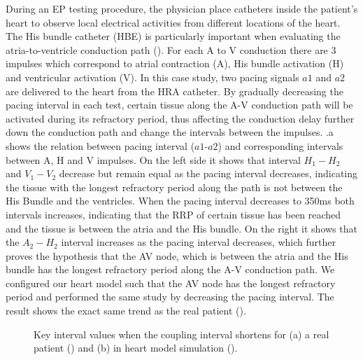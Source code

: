 During an EP testing procedure, the physician place catheters inside the patient's heart to observe local electrical activities from different locations of the heart. The His bundle catheter (HBE) is particularly important when evaluating the atria-to-ventricle conduction path (). For each A to V conduction there are 3 impulses which correspond to atrial contraction (A), His bundle activation (H) and ventricular activation (V).  In this case study, two pacing signals $a1$ and $a2$ are delivered to the heart from the HRA catheter. By gradually decreasing the pacing interval in each test, certain tissue along the A-V conduction path will be activated during its refractory period, thus affecting the conduction delay further down the conduction path and change the intervals between the impulses. .a shows the relation between pacing interval ($a1$-$a2$) and corresponding intervals between A, H and V impulses. On the left side it shows that interval $H_1-H_2$ and $V_1-V_2$ decrease but remain equal as the pacing interval decreases, indicating the tissue with the longest refractory period along the path is not between the His Bundle and the ventricles. When the pacing interval decreases to 350ms both intervals increases, indicating that the RRP of certain tissue has been reached and the tissue is between the atria and the His bundle. On the right it shows that the $A_2-H_2$ interval increases as the pacing interval decreases, which further proves the hypothesis that the AV node, which is between the atria and the His bundle has the longest refractory period along the A-V conduction path. We configured our heart model such that the AV node has the longest refractory period and performed the same study by decreasing the pacing interval. The result shows the exact same trend as the real patient ().
\begin{figure}[!t]
\centering
\label{fig:Case_1}
\caption{\small Key interval values when the coupling interval shortens for (a) a real patient (\cite{josephson}) and (b) in heart model simulation (\cite{vhm_ecrts10}).}
\end{figure} 


